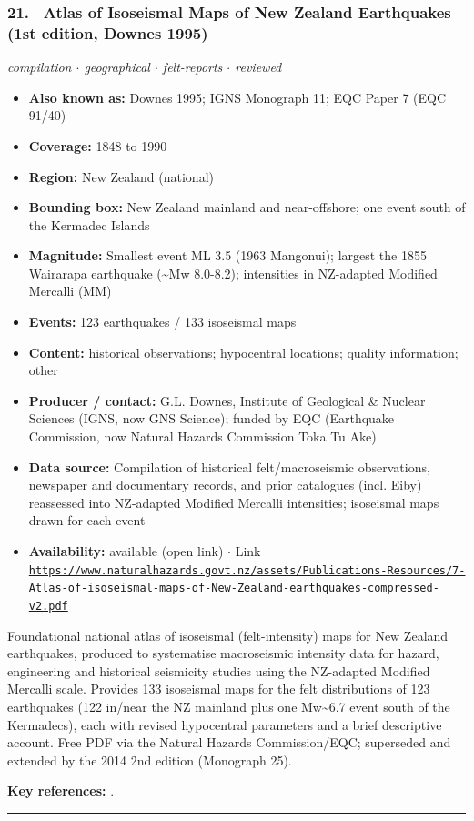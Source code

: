 \documentclass[10pt,a4paper]{article}
\newcommand{\catentryrule}{\par\vspace{3pt}\noindent\textcolor{rulegrey}{\rule{\linewidth}{0.3pt}}\par\vspace{5pt}}
\newcommand{\kv}[2]{\item \textbf{#1:} #2}
\begin{document}
\subsubsection*{\hypertarget{c:21}{21.}~ Atlas of Isoseismal Maps of New Zealand Earthquakes (1st edition, Downes 1995)}
{\small\itshape compilation $\cdot$ geographical $\cdot$ felt-reports $\cdot$ reviewed}\par\vspace{2pt}
\begin{itemize}[leftmargin=1.3em,itemsep=0.6pt,topsep=1pt,parsep=0pt]
\kv{Also known as}{Downes 1995; IGNS Monograph 11; EQC Paper 7 (EQC 91/40)}
\kv{Coverage}{1848 to 1990}
\kv{Region}{New Zealand (national)}
\kv{Bounding box}{New Zealand mainland and near-offshore; one event south of the Kermadec Islands}
\kv{Magnitude}{Smallest event ML 3.5 (1963 Mangonui); largest the 1855 Wairarapa earthquake (\textasciitilde{}Mw 8.0-8.2); intensities in NZ-adapted Modified Mercalli (MM)}
\kv{Events}{123 earthquakes / 133 isoseismal maps}
\kv{Content}{historical observations; hypocentral locations; quality information; other}
\kv{Producer / contact}{G.L. Downes, Institute of Geological \& Nuclear Sciences (IGNS, now GNS Science); funded by EQC (Earthquake Commission, now Natural Hazards Commission Toka Tu Ake)}
\kv{Data source}{Compilation of historical felt/macroseismic observations, newspaper and documentary records, and prior catalogues (incl. Eiby) reassessed into NZ-adapted Modified Mercalli intensities; isoseismal maps drawn for each event}
\kv{Availability}{available (open link) $\cdot$ Link \href{https://www.naturalhazards.govt.nz/assets/Publications-Resources/7-Atlas-of-isoseismal-maps-of-New-Zealand-earthquakes-compressed-v2.pdf}{\nolinkurl{https://www.naturalhazards.govt.nz/assets/Publications-Resources/7-Atlas-of-isoseismal-maps-of-New-Zealand-earthquakes-compressed-v2.pdf}}}
\end{itemize}
\par\vspace{2pt}Foundational national atlas of isoseismal (felt-intensity) maps for New Zealand earthquakes, produced to systematise macroseismic intensity data for hazard, engineering and historical seismicity studies using the NZ-adapted Modified Mercalli scale. Provides 133 isoseismal maps for the felt distributions of 123 earthquakes (122 in/near the NZ mainland plus one Mw\textasciitilde{}6.7 event south of the Kermadecs), each with revised hypocentral parameters and a brief descriptive account. Free PDF via the Natural Hazards Commission/EQC; superseded and extended by the 2014 2nd edition (Monograph 25).
\par\vspace{2pt}\textbf{Key references:} \cite{Downes1995}.
\catentryrule
\end{document}
